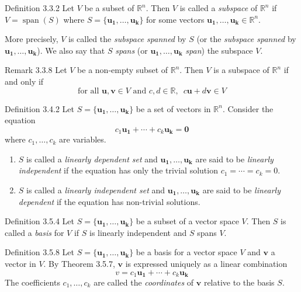 \documentclass[10pt,landscape]{article}
\newcommand{\vect}[1]{\bm{#1}}
\newcommand{\lspan}{\operatorname{span}}
\theoremstyle{definition}
\newcommand{\thistheoremname}{}
\newtheorem*{genericthm*}{\thistheoremname}
\newenvironment{namedthm*}[1]
{\renewcommand{\thistheoremname}{#1}\begin{genericthm*}}
{\end{genericthm*}}
\begin{document}
\begin{multicols}{3}
\begin{namedthm*}{Definition 3.3.2}
     Let \(V\) be a subset of \(\mathbb{R}^n\). Then \(V\) is called a \textit{subspace} of \(\mathbb{R}^n\) if \(V = \lspan(S)\) where \(S = \{\vect{u_1}, \dots, \vect{u_k}\}\) for some vectors \(\vect{u_1}, \dots, \vect{u_k} \in \mathbb{R}^n \).
     
     \medskip
     \noindent
     More precisely, \(V\) is called the \textit{subspace spanned} by \(S\) (or the \textit{subspace spanned} by \( \vect{u_1}, \dots, \vect{u_k} \)). We also say that \(S\) \textit{spans} (or \(\vect{u_1}, \dots, \vect{u_k}\) \textit{span}) the subspace \(V\).
\end{namedthm*}

\begin{namedthm*}{Remark 3.3.8}
    Let \(V\) be a non-empty subset of \(\mathbb{R}^n\). Then \(V\) is a subspace of \(\mathbb{R}^n\) if and only if 
    \[
        \text{for all \(\vect{u}, \vect{v} \in V\) and \(c, d\in \mathbb{R}\)},\enspace c\vect{u} + d\vect{v} \in V
    \]
\end{namedthm*}

\begin{namedthm*}{Definition 3.4.2}
    Let \(S = \{\vect{u_1}, \dots, \vect{u_k}\}\) be a set of vectors in \(\mathbb{R}^n\). Consider the equation
    \[
        c_1\vect{u_1} + \cdots + c_k\vect{u_k} = \vect{0}
    \]
    where \(c_1, \dots, c_k\) are variables.
    \begin{enumerate}
        \item \(S\) is called a \textit{linearly dependent set} and \(\vect{u_1}, \dots, \vect{u_k}\) are said to be \textit{linearly independent} if the equation has only the trivial solution \(c_1 = \cdots = c_k = 0\).
        \item \(S\) is called a \textit{linearly independent set} and \(\vect{u_1}, \dots, \vect{u_k}\) are said to be \textit{linearly dependent} if the equation has non-trivial solutions.
    \end{enumerate}
\end{namedthm*}

\begin{namedthm*}{Definition 3.5.4}
    Let \(S = \{\vect{u_1}, \dots, \vect{u_k}\}\) be a subset of a vector space \(V\). Then \(S\) is called a \textit{basis} for \(V\) if \(S\) is linearly independent and \(S\) spans \(V\).
\end{namedthm*}

\begin{namedthm*}{Definition 3.5.8}
    Let \(S = \{\vect{u_1}, \dots, \vect{u_k}\}\) be a basis for a vector space \(V\) and \(\vect{v}\) a vector in \(V\). By Theorem 3.5.7, \(\vect{v}\) is expressed uniquely as a linear combination
    \[
        v = c_1\vect{u_1} + \cdots + c_k\vect{u_k}
    \]
    The coefficients \(c_1, \dots, c_k\) are called the \textit{coordinates} of \(\vect{v}\) relative to the basis \(S\).
    

\end{namedthm*}
\end{multicols}
\end{document}
